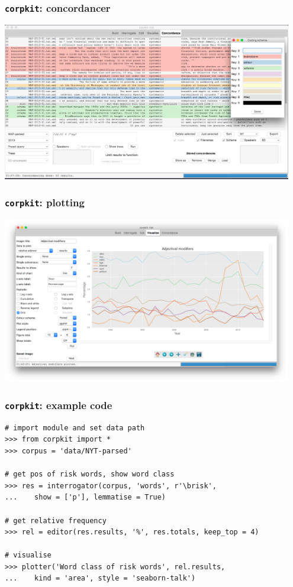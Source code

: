 \documentclass{beamer}       %
\begin{document}
\begin{frame}
    \frametitle{\texttt{corpkit}: concordancer}
    \centering
    \includegraphics[width=0.95\textwidth]{../../images/conc2}
\end{frame}

\begin{frame}
    \frametitle{\texttt{corpkit}: plotting}
    \centering
    \includegraphics[width=0.95\textwidth]{../../images/plott}
\end{frame}

\begin{frame}[fragile]
\frametitle{\texttt{corpkit}: example code}

\begin{verbatim}
# import module and set data path
>>> from corpkit import *
>>> corpus = 'data/NYT-parsed'

# get pos of risk words, show word class
>>> res = interrogator(corpus, 'words', r'\brisk', 
...    show = ['p'], lemmatise = True)

# get relative frequency
>>> rel = editor(res.results, '%', res.totals, keep_top = 4)

# visualise
>>> plotter('Word class of risk words', rel.results, 
...    kind = 'area', style = 'seaborn-talk')
\end{verbatim}
\end{frame}
\end{document}

